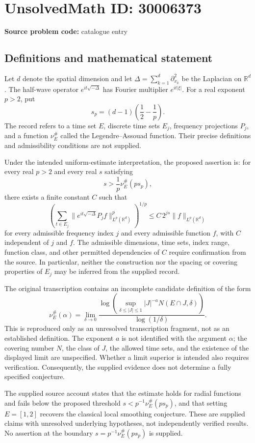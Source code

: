 \documentclass[11pt]{article}
\newcommand{\R}{\mathbb{R}}
\begin{document}
\section*{UnsolvedMath ID: 30006373}
\textbf{Source problem code:} catalogue entry
\subsection{Definitions and mathematical statement}
Let \(d\) denote the spatial dimension and let \(\Delta=\sum_{k=1}^{d}\partial_{x_k}^{2}\) be the Laplacian on \(\R^d\). The half-wave operator \(e^{it\sqrt{-\Delta}}\) has Fourier multiplier \(e^{it|\xi|}\). For a real exponent \(p>2\), put
\[
s_p=(d-1)\left(\frac12-\frac1p\right).
\]
The record refers to a time set \(E\), discrete time sets \(E_j\), frequency projections \(P_j\), and a function \(\nu_E^{\#}\) called the Legendre--Assouad function. Their precise definitions and admissibility conditions are not supplied.

Under the intended uniform-estimate interpretation, the proposed assertion is: for every real \(p>2\) and every real \(s\) satisfying
\[
s>\frac1p\nu_E^{\#}(p s_p),
\]
there exists a finite constant \(C\) such that
\[
\left(\sum_{t\in E_j}
\bigl\|e^{it\sqrt{-\Delta}}P_jf\bigr\|_{L^p(\R^d)}^p\right)^{1/p}
\le C\,2^{js}\|f\|_{L^p(\R^d)}
\]
for every admissible frequency index \(j\) and every admissible function \(f\), with \(C\) independent of \(j\) and \(f\). The admissible dimensions, time sets, index range, function class, and other permitted dependencies of \(C\) require confirmation from the source. In particular, neither the construction nor the spacing or covering properties of \(E_j\) may be inferred from the supplied record.

The original transcription contains an incomplete candidate definition of the form
\[
\nu_E^{\#}(\alpha)
=\lim_{\delta\to0}
\frac{\log\!\left(\sup_{\delta\le |J|\le1}
|J|^{-a}N(E\cap J,\delta)\right)}
{\log(1/\delta)}.
\]
This is reproduced only as an unresolved transcription fragment, not as an established definition. The exponent \(a\) is not identified with the argument \(\alpha\); the covering number \(N\), the class of \(J\), the allowed time sets, and the existence of the displayed limit are unspecified. Whether a limit superior is intended also requires verification. Consequently, the supplied evidence does not determine a fully specified conjecture.

The supplied source account states that the estimate holds for radial functions and fails below the proposed threshold \(s<p^{-1}\nu_E^{\#}(p s_p)\), and that setting \(E=[1,2]\) recovers the classical local smoothing conjecture. These are supplied claims with unresolved underlying hypotheses, not independently verified results. No assertion at the boundary \(s=p^{-1}\nu_E^{\#}(p s_p)\) is supplied.
\end{document}
